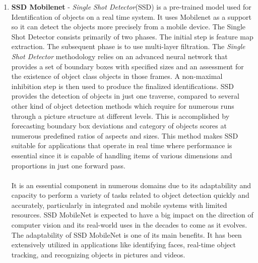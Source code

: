 \documentclass[MScCS]{uccthesis}
\begin{document}
\begin{enumerate}
    \item \textbf{SSD Mobilenet} - \textit{Single Shot Detector}(SSD) is a pre-trained model used for Identification of objects on a real time system. It uses Mobilenet as a support so it can detect the objects more precisely from a mobile device. The Single Shot Detector consists primarily of two phases. The initial step is feature map extraction. The subsequent phase is to use multi-layer filtration\Parencite{ssd1}. The \textit{Single Shot Detector} methodology relies on an advanced neural network that provides a set of boundary boxes with specified sizes and an assessment for the existence of object class objects in those frames. A non-maximal inhibition step is then used to produce the finalized identifications. SSD provides the detection of objects in just one traverse, compared to several other kind of object detection methods which require for numerous runs through a picture structure at different levels. This is accomplished by forecasting boundary box deviations and category of objects scores at numerous predefined ratios of aspects and sizes. This method makes SSD suitable for applications that operate in real time where performance is essential since it is capable of handling items of various dimensions and proportions in just one forward pass.\\
    \\It is an essential component in numerous domains due to its adaptability and capacity to perform a variety of tasks related to object detection quickly and accurately, particularly in integrated and mobile systems with limited resources. SSD MobileNet is expected to have a big impact on the direction of computer vision and its real-world uses in the decades to come as it evolves. The adaptability of SSD MobileNet is one of its main benefits. It has been extensively utilized in applications like identifying faces, real-time object tracking, and recognizing objects in pictures and videos. 



\end{enumerate}
\end{document}
